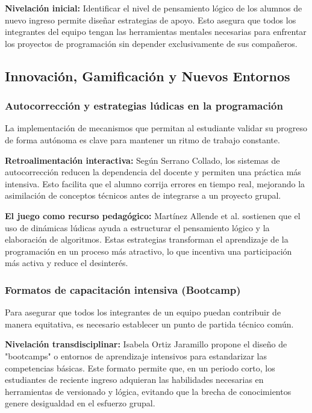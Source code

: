 \documentclass[12pt,a4paper]{article}
\begin{document}
\textbf{Nivelación inicial:} Identificar el nivel de pensamiento lógico de los alumnos de nuevo ingreso permite diseñar estrategias de apoyo. Esto asegura que todos los integrantes del equipo tengan las herramientas mentales necesarias para enfrentar los proyectos de programación sin depender exclusivamente de sus compañeros.\cite{tayacaja2023}

\subsection{Innovación, Gamificación y Nuevos Entornos}

\subsubsection{Autocorrección y estrategias lúdicas en la programación}
La implementación de mecanismos que permitan al estudiante validar su progreso de forma autónoma es clave para mantener un ritmo de trabajo constante.

\textbf{Retroalimentación interactiva:} Según Serrano Collado, los sistemas de autocorrección reducen la dependencia del docente y permiten una práctica más intensiva. Esto facilita que el alumno corrija errores en tiempo real, mejorando la asimilación de conceptos técnicos antes de integrarse a un proyecto grupal.\cite{serrano2023}

\textbf{El juego como recurso pedagógico:} Martínez Allende et al. sostienen que el uso de dinámicas lúdicas ayuda a estructurar el pensamiento lógico y la elaboración de algoritmos. Estas estrategias transforman el aprendizaje de la programación en un proceso más atractivo, lo que incentiva una participación más activa y reduce el desinterés.\cite{martinez2022}

\subsubsection{Formatos de capacitación intensiva (Bootcamp)}
Para asegurar que todos los integrantes de un equipo puedan contribuir de manera equitativa, es necesario establecer un punto de partida técnico común.

\textbf{Nivelación transdisciplinar:} Isabela Ortiz Jaramillo propone el diseño de "bootcamps" o entornos de aprendizaje intensivos para estandarizar las competencias básicas. Este formato permite que, en un periodo corto, los estudiantes de reciente ingreso adquieran las habilidades necesarias en herramientas de versionado y lógica, evitando que la brecha de conocimientos genere desigualdad en el esfuerzo grupal.\cite{ortiz2024}
\end{document}
